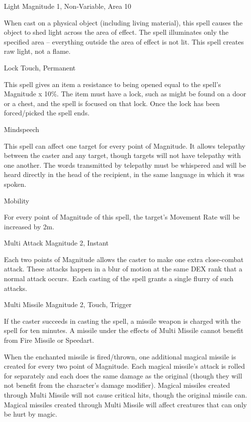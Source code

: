 \begin{rpg-spell}
{Light}
{Magnitude 1, Non-Variable, Area 10}

When cast on a physical object (including living material), this spell causes the object to shed light across the area of effect. The spell illuminates only the specified area – everything outside the area of effect is not lit. This spell creates raw light, not a flame.
\end{rpg-spell}


\begin{rpg-spell}
{Lock}
{Touch, Permanent}

This spell gives an item a resistance to being opened equal to the spell’s Magnitude x 10\%. The item must have a lock, such as might be found on a door or a chest, and the spell is focused on that lock. Once the lock has been forced/picked the spell ends.
\end{rpg-spell}


\begin{rpg-spell}
{Mindspeech}
{}

This spell can affect one target for every point of Magnitude. It allows telepathy between the caster and any target, though targets will not have telepathy with one another. The words transmitted by telepathy must be whispered and will be heard directly in the head of the recipient, in the same language in which it was spoken. 
\end{rpg-spell}


\begin{rpg-spell}
{Mobility}
{}

For every point of Magnitude of this spell, the target’s Movement Rate will be increased by 2m.
\end{rpg-spell}


\begin{rpg-spell}
{Multi Attack}
{Magnitude 2, Instant}

Each two points of Magnitude allows the caster to make one extra close-combat attack. These attacks happen in a blur of motion at the same DEX rank that a normal attack occurs. Each casting of the spell grants a single flurry of such attacks.
\end{rpg-spell}


\begin{rpg-spell}
{Multi Missile}
{Magnitude 2, Touch, Trigger}

If the caster succeeds in casting the spell, a missile weapon is charged with the spell for ten minutes. A missile under the effects of Multi Missile cannot benefit from Fire Missile or Speedart. 

When the enchanted missile is fired/thrown, one additional magical missile is created for every two point of Magnitude. Each magical missile’s attack is rolled for separately and each does the same damage as the original (though they will not benefit from the character’s damage modifier). Magical missiles created through Multi Missile will not cause critical hits, though the original missile can. Magical missiles created through Multi Missile will affect creatures that can only be hurt by magic. 
\end{rpg-spell}


